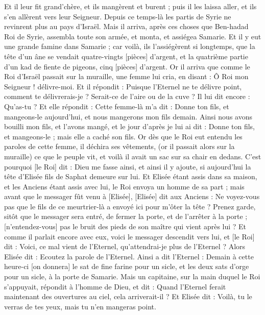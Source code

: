 \begin{multicols}{2}
Et il leur fit grand'chère, et ils mangèrent et burent ; puis il les laissa aller, et ils s'en allèrent vers leur Seigneur. Depuis ce temps-là les partis de Syrie ne revinrent plus au pays d'Israël.
Mais il arriva, après ces choses que Ben-hadad Roi de Syrie, assembla toute son armée, et monta, et assiégea Samarie.
Et il y eut une grande famine dans Samarie ; car voilà, ils l'assiégèrent si longtemps, que la tête d'un âne se vendait quatre-vingts [pièces] d'argent, et la quatrième partie d'un kad de fiente de pigeons, cinq [pièces] d'argent.
Or il arriva que comme le Roi d'Israël passait sur la muraille, une femme lui cria, en disant : Ô Roi mon Seigneur ! délivre-moi.
Et il répondit : Puisque l'Eternel ne te délivre point, comment te délivrerais-je ? Serait-ce de l'aire ou de la cuve ?
Il lui dit encore : Qu'as-tu ? Et elle répondit : Cette femme-là m'a dit : Donne ton fils, et mangeons-le aujourd'hui, et nous mangerons mon fils demain.
Ainsi nous avons bouilli mon fils, et l'avons mangé, et le jour d'après je lui ai dit : Donne ton fils, et mangeons-le ; mais elle a caché son fils.
Or dès que le Roi eut entendu les paroles de cette femme, il déchira ses vêtements, (or il passait alors sur la muraille) ce que le peuple vit, et voilà il avait un sac sur sa chair en dedans.
C'est pourquoi [le Roi] dit : Dieu me fasse ainsi, et ainsi il y ajoute, si aujourd'hui la tête d'Elisée fils de Saphat demeure sur lui.
Et Elisée étant assis dans sa maison, et les Anciens étant assis avec lui, le Roi envoya un homme de sa part ; mais avant que le messager fût venu à [Elisée], [Elisée] dit aux Anciens : Ne voyez-vous pas que le fils de ce meurtrier-là a envoyé ici pour m'ôter la tête ? Prenez garde, sitôt que le messager sera entré, de fermer la porte, et de l'arrêter à la porte ; [n'entendez-vous] pas le bruit des pieds de son maître qui vient après lui ?
Et comme il parlait encore avec eux, voici le messager descendit vers lui, et [le Roi] dit : Voici, ce mal vient de l'Eternel, qu'attendrai-je plus de l'Eternel ?
\VerseOne{}Alors Elisée dit : Ecoutez la parole de l'Eternel. Ainsi a dit l'Eternel : Demain à cette heure-ci [on donnera] le sat de fine farine pour un sicle, et les deux sats d'orge pour un sicle, à la porte de Samarie.
Mais un capitaine, sur la main duquel le Roi s'appuyait, répondit à l'homme de Dieu, et dit : Quand l'Eternel ferait maintenant des ouvertures au ciel, cela arriverait-il ? Et Elisée dit : Voilà, tu le verras de tes yeux, mais tu n'en mangeras point.

\end{multicols}
